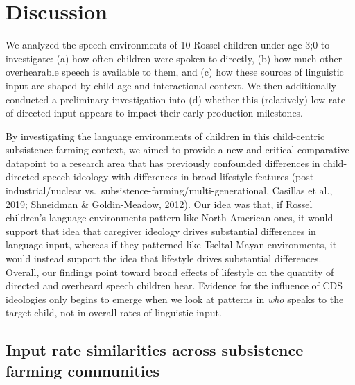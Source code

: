 \documentclass[
  english,
  ,man,floatsintext]{apa6}
\begin{document}
\hypertarget{disc}{%
\section{Discussion}\label{disc}}

We analyzed the speech environments of 10 Rossel children under age 3;0 to investigate: (a) how often children were spoken to directly, (b) how much other overhearable speech is available to them, and (c) how these sources of linguistic input are shaped by child age and interactional context. We then additionally conducted a preliminary investigation into (d) whether this (relatively) low rate of directed input appears to impact their early production milestones.

By investigating the language environments of children in this child-centric subsistence farming context, we aimed to provide a new and critical comparative datapoint to a research area that has previously confounded differences in child-directed speech ideology with differences in broad lifestyle features (post-industrial/nuclear vs.~subsistence-farming/multi-generational, Casillas et al., 2019; Shneidman \& Goldin-Meadow, 2012). Our idea was that, if Rossel children's language environments pattern like North American ones, it would support that idea that caregiver ideology drives substantial differences in language input, whereas if they patterned like Tseltal Mayan environments, it would instead support the idea that lifestyle drives substantial differences. Overall, our findings point toward broad effects of lifestyle on the quantity of directed and overheard speech children hear. Evidence for the influence of CDS ideologies only begins to emerge when we look at patterns in \emph{who} speaks to the target child, not in overall rates of linguistic input.

\hypertarget{input-rate-similarities-across-subsistence-farming-communities}{%
\subsection{Input rate similarities across subsistence farming communities}\label{input-rate-similarities-across-subsistence-farming-communities}}
\end{document}
